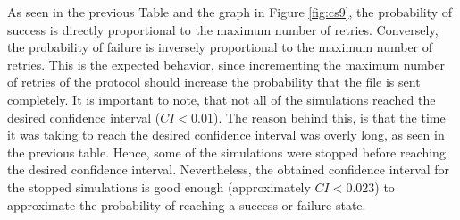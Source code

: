 As seen in the previous Table and the graph in Figure \ref{fig:cs9}, the probability of success is directly proportional to the maximum number of retries. Conversely, the probability of failure is inversely proportional to the maximum number of retries. This is the expected behavior, since incrementing the maximum number of retries of the protocol should increase the probability that the file is sent completely. It is important to note, that not all of the simulations reached the desired confidence interval ($CI < 0.01$). The reason behind this, is that the time it  was taking to reach the desired confidence interval was overly long, as seen in the previous table. Hence, some of the simulations were stopped before reaching the desired confidence interval. Nevertheless, the obtained confidence interval for the stopped simulations is good enough (approximately $CI < 0.023$) to approximate the probability of reaching a success or failure state.

